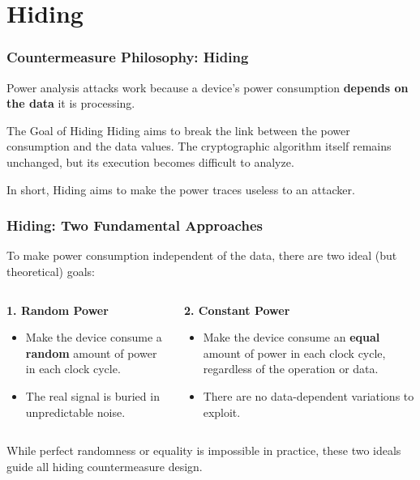 \section{Hiding}

\begin{frame}
    \frametitle{Countermeasure Philosophy: Hiding}
    
        Power analysis attacks work because a device's power consumption \textbf{depends on the data} it is processing.
  
    
    \begin{alertblock}{The Goal of Hiding}
        Hiding aims to break the link between the power consumption and the data values. The cryptographic algorithm itself remains unchanged, but its execution becomes difficult to analyze.
    \end{alertblock}
    
    In short, Hiding aims to make the power traces useless to an attacker.
    
\end{frame}

\begin{frame}
    \frametitle{Hiding: Two Fundamental Approaches}
    
    To make power consumption independent of the data, there are two ideal (but theoretical) goals:
    
    \begin{columns}[T]
        \begin{column}{0.5\textwidth}
            \textbf{1. Random Power}
            \begin{itemize}
                \item Make the device consume a \textbf{random} amount of power in each clock cycle.
                \item The real signal is buried in unpredictable noise.
            \end{itemize}
        \end{column}
        
        \begin{column}{0.5\textwidth}
            \textbf{2. Constant Power}
            \begin{itemize}
                \item Make the device consume an \textbf{equal} amount of power in each clock cycle, regardless of the operation or data.
                \item There are no data-dependent variations to exploit.
            \end{itemize}
        \end{column}
    \end{columns}
    
    While perfect randomness or equality is impossible in practice, these two ideals guide all hiding countermeasure design.
    
\end{frame}

